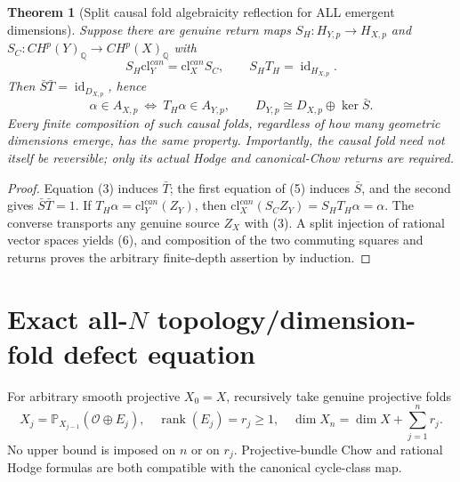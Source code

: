 \documentclass[11pt]{article}
\newtheorem{theorem}{Theorem}
\begin{document}
\begin{theorem}[Split causal fold algebraicity reflection for ALL emergent dimensions]
Suppose there are genuine return maps $S_H:H_{Y,p}\to H_{X,p}$
and $S_C:CH^p(Y)_{\mathbb Q}\to CH^p(X)_{\mathbb Q}$ with
\[
 S_H\mathrm{cl}^{can}_Y=\mathrm{cl}^{can}_X S_C,
 \qquad S_HT_H=\operatorname{id}_{H_{X,p}}.        \tag{5}
\]
Then $\bar S\bar T=\operatorname{id}_{D_{X,p}}$, hence
\[
 \boxed{\alpha\in A_{X,p}\ \Longleftrightarrow\
                  T_H\alpha\in A_{Y,p}},\qquad
 \boxed{D_{Y,p}\cong D_{X,p}\oplus\ker\bar S}.       \tag{6}
\]
Every finite composition of such causal folds, regardless of
how many geometric dimensions emerge, has the same property.
Importantly, the causal fold need not itself be reversible;
only its actual Hodge and canonical-Chow returns are required.
\end{theorem}
\begin{proof}
Equation (3) induces $\bar T$; the first equation of (5)
induces $\bar S$, and the second gives $\bar S\bar T=1$.
If $T_H\alpha=\mathrm{cl}^{can}_Y(Z_Y)$, then
$\mathrm{cl}^{can}_X(S_C Z_Y)=S_H T_H\alpha=\alpha$.
The converse transports any genuine source $Z_X$ with (3).
A split injection of rational vector spaces yields (6),
and composition of the two commuting squares and returns
proves the arbitrary finite-depth assertion by induction.
\end{proof}

\section{Exact all-$N$ topology/dimension-fold defect equation}
For arbitrary smooth projective $X_0=X$, recursively take
genuine projective folds
\[
 X_j=\mathbb P_{X_{j-1}}(\mathcal O\oplus E_j),
 \quad \operatorname{rank}(E_j)=r_j\ge1,
 \quad \dim X_n=\dim X+\sum_{j=1}^n r_j .
\]
No upper bound is imposed on $n$ or on $r_j$.
Projective-bundle Chow and rational Hodge formulas are
both compatible with the canonical cycle-class map.
\end{document}
